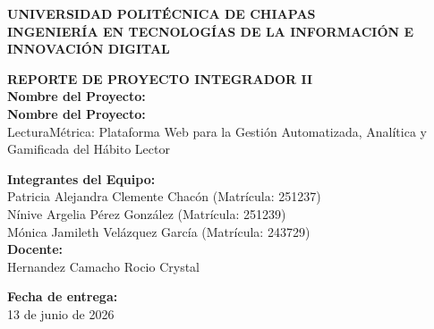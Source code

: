 \documentclass[12pt, atypical, journal]{article}
\begin{document}
\begin{titlepage}
   \begin{center}
       \vspace*{1cm}
      
       {\Large\bfseries UNIVERSIDAD POLITÉCNICA DE CHIAPAS} \\[0.5cm]
       {\large\bfseries INGENIERÍA EN TECNOLOGÍAS DE LA INFORMACIÓN E INNOVACIÓN DIGITAL} \\[1.5cm]
      
       \vfill
      
       {\Large\bfseries REPORTE DE PROYECTO INTEGRADOR II} \\[1cm]
      
       \textbf{Nombre del Proyecto:} \\
       \textbf{Nombre del Proyecto:} \\
       {\large LecturaMétrica: Plataforma Web para la Gestión Automatizada, Analítica y Gamificada del Hábito Lector} \\[1.5cm]
      
       \vfill
      
       \textbf{Integrantes del Equipo:} \\[0.3cm]
       {\large Patricia Alejandra Clemente Chacón (Matrícula: 251237)} \\
       {\large Nínive Argelia Pérez González (Matrícula: 251239)} \\
       {\large Mónica Jamileth Velázquez García (Matrícula: 243729)} \\[1.5cm]
      
       \textbf{Docente:} \\
       {\large Hernandez Camacho Rocio Crystal} \\[1.5cm]
      
       \vfill
      
       \textbf{Fecha de entrega:} \\
       {\large 13 de junio de 2026}
      
       \vspace*{1cm}
   \end{center}
\end{titlepage}

\newpage

\tableofcontents
\newpage
\end{document}
